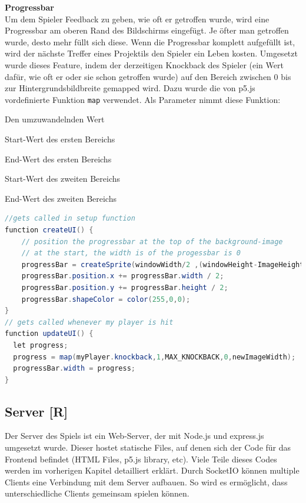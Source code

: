 \textbf{Progressbar} \label{impl:progressbar} \\
Um dem Spieler Feedback zu geben, wie oft er getroffen wurde, wird eine Progressbar am oberen Rand des Bildschirms eingefügt. Je öfter man getroffen wurde, desto mehr füllt sich diese.
Wenn die Progressbar komplett aufgefüllt ist, wird der nächste Treffer eines Projektils den Spieler ein Leben kosten.
Umgesetzt wurde dieses Feature, indem der derzeitigen Knockback des Spieler (ein Wert dafür, wie oft er oder sie schon getroffen wurde) auf den Bereich zwischen 0 bis zur Hintergrundsbildbreite gemapped wird. Dazu wurde die von p5.js vordefinierte Funktion \texttt{map} verwendet.
Als Parameter nimmt diese Funktion:
\begin{compactitem}
    \item Den umzuwandelnden Wert
    \item Start-Wert des ersten Bereichs
    \item End-Wert des ersten Bereichs
    \item Start-Wert des zweiten Bereichs
    \item End-Wert des zweiten Bereichs
\end{compactitem}
\begin{lstlisting}[language=Java, caption=Progressbar,label=lst:impl:progressbar]
//gets called in setup function
function createUI() {
    // position the progressbar at the top of the background-image
    // at the start, the width is of the progessbar is 0
    progressBar = createSprite(windowWidth/2 ,(windowHeight-ImageHeight) / 2,0, width);
    progressBar.position.x += progressBar.width / 2;
    progressBar.position.y += progressBar.height / 2;
    progressBar.shapeColor = color(255,0,0);
}
// gets called whenever my player is hit
function updateUI() {
  let progress;
  progress = map(myPlayer.knockback,1,MAX_KNOCKBACK,0,newImageWidth);
  progressBar.width = progress;
}
\end{lstlisting}

\subsection{Server [R]}
Der Server des Spiels ist ein Web-Server, der mit Node.js und express.js umgesetzt wurde.
Dieser hostet statische Files, auf denen sich der Code für das Frontend befindet (HTML Files, p5.js library, etc).
Viele Teile dieses Codes werden im vorherigen Kapitel detailliert erklärt.
Durch SocketIO können multiple Clients eine Verbindung mit dem Server aufbauen.
So wird es ermöglicht, dass unterschiedliche Clients gemeinsam spielen können.

